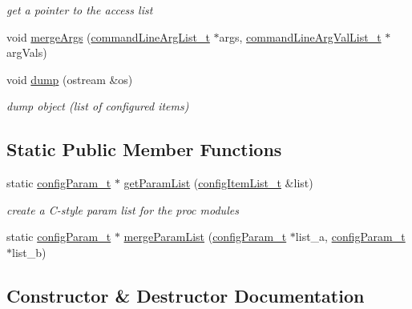 \begin{DoxyCompactItemize}
\begin{DoxyCompactList}\small\item\em get a pointer to the access list \end{DoxyCompactList}\item 
void \hyperlink{classConfigManager_aa8cff61a46545834f88553cfb00beefd}{merge\+Args} (\hyperlink{CommandLineArgs_8h_aaee5f0d903dd3ebb586b68e0cd4d5594}{command\+Line\+Arg\+List\+\_\+t} $\ast$args, \hyperlink{CommandLineArgs_8h_a092e791e8505f700f627414f125dcd6e}{command\+Line\+Arg\+Val\+List\+\_\+t} $\ast$arg\+Vals)
\item 
\mbox{\label{classConfigManager_abc8efd3c2dd742b3a5fc461eab9d32fc}} 
void \hyperlink{classConfigManager_abc8efd3c2dd742b3a5fc461eab9d32fc}{dump} (ostream \&os)
\begin{DoxyCompactList}\small\item\em dump object (list of configured items) \end{DoxyCompactList}\end{DoxyCompactItemize}
\subsection*{Static Public Member Functions}
\begin{DoxyCompactItemize}
\item 
\mbox{\label{classConfigManager_a64a3c942890179cba28b86e07a3805a8}} 
static \hyperlink{structconfigParam__t}{config\+Param\+\_\+t} $\ast$ \hyperlink{classConfigManager_a64a3c942890179cba28b86e07a3805a8}{get\+Param\+List} (\hyperlink{classconfigItemList__t}{config\+Item\+List\+\_\+t} \&list)
\begin{DoxyCompactList}\small\item\em create a C-\/style param list for the proc modules \end{DoxyCompactList}\item 
static \hyperlink{structconfigParam__t}{config\+Param\+\_\+t} $\ast$ \hyperlink{classConfigManager_af019debefe1c024dc6e222fd0cbd63ef}{merge\+Param\+List} (\hyperlink{structconfigParam__t}{config\+Param\+\_\+t} $\ast$list\+\_\+a, \hyperlink{structconfigParam__t}{config\+Param\+\_\+t} $\ast$list\+\_\+b)
\end{DoxyCompactItemize}


\subsection{Constructor \& Destructor Documentation}
\mbox{\label{classConfigManager_a1676cfe00c3b4e794fdc258d935347a1}} 
